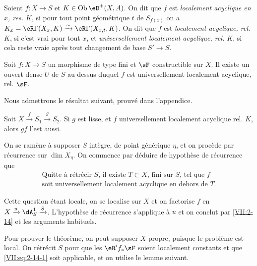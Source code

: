 \begin{definition_}\label{VII:2-12}
Soient $f:X\to S$ et $K\in \ob\eD^+(X,A)$. On dit que $f$ est \emph{localement 
acyclique en $x$, res. $K$}, si pour tout point g\'eom\'etrique $t$ de 
$S_{f(x)}$ on a $K_x=\eR\Gamma(X_x,K)\iso \eR\Gamma(X_{x,t},K)$. On dit que $f$ 
est \emph{localement acyclique, rel. $K$}, si c'est vrai pour tout $x$, et 
\emph{universellement localement acyclique, rel. $K$}, si cela reste vraie 
apr\`es tout changement de base $S' \to S$.
\end{definition_}





\begin{theorem_}\label{VII:2-13}
Soit $f:X\to S$ un morphisme de type fini et $\sF$ constructible sur $X$. Il 
existe un ouvert dense $U$ de $S$ au-dessus duquel $f$ est universellement 
localement acyclique, rel. $\sF$. 
\end{theorem_}

Nous admettrons le r\'esultat suivant, prouv\'e dans l'appendice. 





\begin{lemma_}\label{VII:2-14}
Soit $X\xrightarrow f S_1 \xrightarrow g S_2$. Si $g$ est lisse, et $f$ 
universellement localement acyclique rel. $K$, alors $g f$ l'est aussi. 
\end{lemma_}

On se ram\`ene \`a supposer $S$ int\`egre, de point g\'en\'erique $\eta$, et 
on proc\`ede par r\'ecurrence sur $\dim{X_\eta}$. On commence par d\'eduire de 
hypoth\`ese de r\'ecurrence que 
\begin{equation*}\tag{A}\label{VII:eq:2-14-1}
  \begin{array}{c}
    \text{Quitte \`a r\'etr\'ecir $S$, il existe $T\subset X$, fini sur $S$, tel que $f$} \\
    \text{soit universellement localement acyclique en dehors de $T$.} 
  \end{array}
\end{equation*}

Cette question \'etant locale, on se localise sur $X$ et on factorise $f$ en 
$X\xrightarrow u \dA_S^1 \xrightarrow S$. L'hypoth\`ese de r\'ecurrence 
s'applique \`a $u$ et on conclut par \ref{VII:2-14} et les arguments habituels. 

Pour prouver le th\'eor\`eme, on peut supposer $X$ propre, puisque le 
probl\`eme est local. On r\'etr\'ecit $S$ pour que les $\eR^i f_\ast \sF$ 
soient localement constants et que \eqref{VII:eq:2-14-1} soit applicable, et on 
utilise le lemme suivant. 





